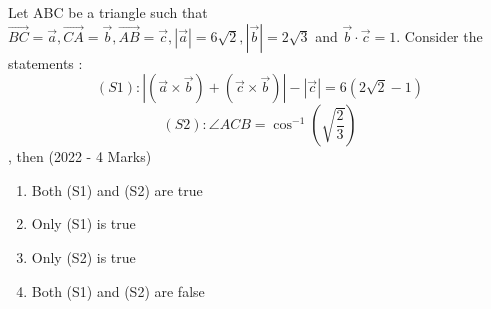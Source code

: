 \documentclass[journal]{IEEEtran}
\begin{document}
\begin{enumerate}
{            Let ABC be a triangle such that $ \overrightarrow{BC}=\overrightarrow{a},\overrightarrow{CA}=\overrightarrow{b},\overrightarrow{AB}=\overrightarrow{c},\left|\overrightarrow{a}\right|=6\sqrt{2},\left|\overrightarrow{b}\right|=2\sqrt{3}$ and $\overrightarrow{b}\cdot\overrightarrow{c}=1.$ 
            Consider the statements : $$ \left(S1\right):\left|\left(\overrightarrow{a}\times\overrightarrow{b}\right)+\left(\overrightarrow{c}\times\overrightarrow{b}\right)\right|-\left|\overrightarrow{c}\right|=6\left(2\sqrt{2}-1\right)$$ $$ \left(S2\right):\angle ACB=\cos^{-1}\left(\sqrt{\frac{2}{3}}\right) $$, then \text{ }
             \hfill
              {(2022 - 4 Marks)}
			\begin{multicols}{2}              
	              		\begin{enumerate}
	              			\item Both (S1) and (S2) are true
	              			\item Only (S1) is true
	              			\item Only (S2) is true
	              			\item Both (S1) and (S2) are false
	              	\end{enumerate}
  			\end{multicols}      
        }
    \end{enumerate}
\end{document}
